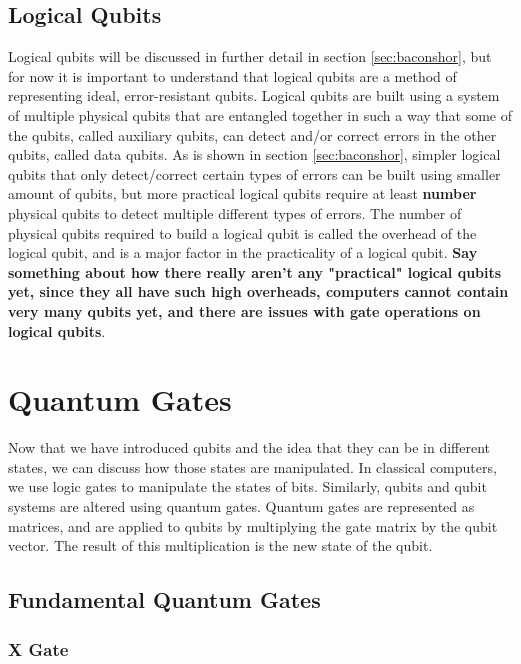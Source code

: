 \documentclass{article}
\begin{document}
\subsection{Logical Qubits}
\label{sec:logicalqubits}
Logical qubits will be discussed in further detail in section \ref{sec:baconshor}, but for now it is important to understand that logical qubits are a method of representing
ideal, error-resistant qubits. Logical qubits are built using a system of multiple physical qubits that are entangled together in such a way that some of the qubits, called 
auxiliary qubits, can detect and/or correct errors in the other qubits, called data qubits. As is shown in section \ref{sec:baconshor}, simpler logical qubits that only 
detect/correct certain types of errors can be built using smaller amount of qubits, but more practical logical qubits require at least \textbf{number} physical qubits to detect
multiple different types of errors. The number of physical qubits required to build a logical qubit is called the overhead of the logical qubit, and is a major factor in the
practicality of a logical qubit. \textbf{Say something about how there really aren't any "practical" logical qubits yet, since they all have such high overheads, computers 
cannot contain very many qubits yet, and there are issues with gate operations on logical qubits}.


\section{Quantum Gates}
\label{sec:quantumgates}

Now that we have introduced qubits and the idea that they can be in different states, we can discuss how those states are manipulated. In classical computers, we use logic
gates to manipulate the states of bits. Similarly, qubits and qubit systems are altered using quantum gates. Quantum gates are represented as matrices, and are applied to
qubits by multiplying the gate matrix by the qubit vector. The result of this multiplication is the new state of the qubit.

\subsection{Fundamental Quantum Gates}
\label{sec:fundamentalgates}

\subsubsection{X Gate}
\label{sec:xgate}
\end{document}
